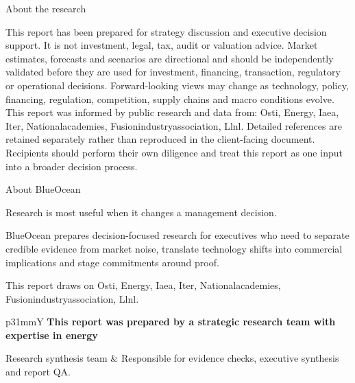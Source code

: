 \documentclass[10pt,a4paper]{article}
\begin{document}
\clearpage
{\sffamily\fontsize{20}{25}\selectfont\color{BONavy} About the research}\par\vspace{6pt}
\vspace{2pt}{\color{BOBright}\rule{\linewidth}{1pt}}\vspace{5pt}
{\footnotesize\color{BOMuted} This report has been prepared for strategy discussion and executive decision support. It is not investment, legal, tax, audit or valuation advice. Market estimates, forecasts and scenarios are directional and should be independently validated before they are used for investment, financing, transaction, regulatory or operational decisions. Forward-looking views may change as technology, policy, financing, regulation, competition, supply chains and macro conditions evolve. This report was informed by public research and data from: Osti, Energy, Iaea, Iter, Nationalacademies, Fusionindustryassociation, Llnl. Detailed references are retained separately rather than reproduced in the client-facing document. Recipients should perform their own diligence and treat this report as one input into a broader decision process.}

\clearpage
\noindent{}\par\vspace{8pt}
{\sffamily\fontsize{24}{30}\selectfont\color{BONavy} About BlueOcean}\par\vspace{10pt}
\begin{minipage}[t]{0.44\linewidth}
{\sffamily\fontsize{16}{22}\selectfont\color{BOGreen} Research is most useful when it changes a management decision.}\par\vspace{8pt}
{\footnotesize\color{BOText} BlueOcean prepares decision-focused research for executives who need to separate credible evidence from market noise, translate technology shifts into commercial implications and stage commitments around proof.}\par\vspace{7pt}
{\footnotesize\color{BOMuted} This report draws on Osti, Energy, Iaea, Iter, Nationalacademies, Fusionindustryassociation, Llnl.}\par
\end{minipage}\hfill\begin{minipage}[t]{0.48\linewidth}
\begin{tabularx}{\linewidth}{p{31mm}Y}
{\small\bfseries This report was prepared by a strategic research team with expertise in energy}\par{\scriptsize\color{BOGreen} Research synthesis team} & {\footnotesize Responsible for evidence checks, executive synthesis and report QA.} \\[7pt]
\end{tabularx}
\end{minipage}
\end{document}

